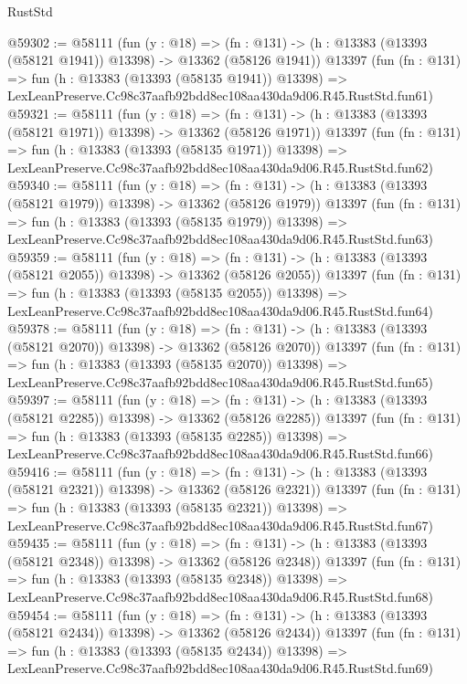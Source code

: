 \begin{lexlean}{RustStd}
\begin{coremodule}
@59302 := @58111
    (fun (y : @18) =>
    (fn : @131) -> (h : @13383 (@13393 (@58121 @1941)) @13398) -> @13362 (@58126 @1941))
    @13397
    (fun (fn : @131) =>
    fun (h : @13383 (@13393 (@58135 @1941)) @13398) =>
    LexLeanPreserve.Cc98c37aafb92bdd8ec108aa430da9d06.R45.RustStd.fun61)
@59321 := @58111
    (fun (y : @18) =>
    (fn : @131) -> (h : @13383 (@13393 (@58121 @1971)) @13398) -> @13362 (@58126 @1971))
    @13397
    (fun (fn : @131) =>
    fun (h : @13383 (@13393 (@58135 @1971)) @13398) =>
    LexLeanPreserve.Cc98c37aafb92bdd8ec108aa430da9d06.R45.RustStd.fun62)
@59340 := @58111
    (fun (y : @18) =>
    (fn : @131) -> (h : @13383 (@13393 (@58121 @1979)) @13398) -> @13362 (@58126 @1979))
    @13397
    (fun (fn : @131) =>
    fun (h : @13383 (@13393 (@58135 @1979)) @13398) =>
    LexLeanPreserve.Cc98c37aafb92bdd8ec108aa430da9d06.R45.RustStd.fun63)
@59359 := @58111
    (fun (y : @18) =>
    (fn : @131) -> (h : @13383 (@13393 (@58121 @2055)) @13398) -> @13362 (@58126 @2055))
    @13397
    (fun (fn : @131) =>
    fun (h : @13383 (@13393 (@58135 @2055)) @13398) =>
    LexLeanPreserve.Cc98c37aafb92bdd8ec108aa430da9d06.R45.RustStd.fun64)
@59378 := @58111
    (fun (y : @18) =>
    (fn : @131) -> (h : @13383 (@13393 (@58121 @2070)) @13398) -> @13362 (@58126 @2070))
    @13397
    (fun (fn : @131) =>
    fun (h : @13383 (@13393 (@58135 @2070)) @13398) =>
    LexLeanPreserve.Cc98c37aafb92bdd8ec108aa430da9d06.R45.RustStd.fun65)
@59397 := @58111
    (fun (y : @18) =>
    (fn : @131) -> (h : @13383 (@13393 (@58121 @2285)) @13398) -> @13362 (@58126 @2285))
    @13397
    (fun (fn : @131) =>
    fun (h : @13383 (@13393 (@58135 @2285)) @13398) =>
    LexLeanPreserve.Cc98c37aafb92bdd8ec108aa430da9d06.R45.RustStd.fun66)
@59416 := @58111
    (fun (y : @18) =>
    (fn : @131) -> (h : @13383 (@13393 (@58121 @2321)) @13398) -> @13362 (@58126 @2321))
    @13397
    (fun (fn : @131) =>
    fun (h : @13383 (@13393 (@58135 @2321)) @13398) =>
    LexLeanPreserve.Cc98c37aafb92bdd8ec108aa430da9d06.R45.RustStd.fun67)
@59435 := @58111
    (fun (y : @18) =>
    (fn : @131) -> (h : @13383 (@13393 (@58121 @2348)) @13398) -> @13362 (@58126 @2348))
    @13397
    (fun (fn : @131) =>
    fun (h : @13383 (@13393 (@58135 @2348)) @13398) =>
    LexLeanPreserve.Cc98c37aafb92bdd8ec108aa430da9d06.R45.RustStd.fun68)
@59454 := @58111
    (fun (y : @18) =>
    (fn : @131) -> (h : @13383 (@13393 (@58121 @2434)) @13398) -> @13362 (@58126 @2434))
    @13397
    (fun (fn : @131) =>
    fun (h : @13383 (@13393 (@58135 @2434)) @13398) =>
    LexLeanPreserve.Cc98c37aafb92bdd8ec108aa430da9d06.R45.RustStd.fun69)

\end{coremodule}
\end{lexlean}
